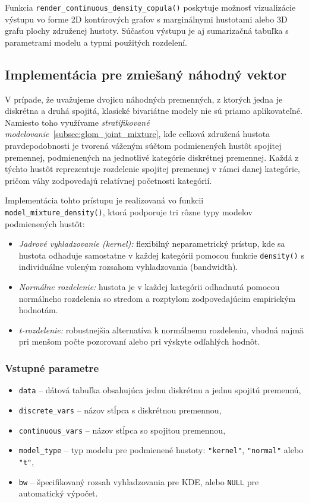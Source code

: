 Funkcia \texttt{render\_continuous\_density\_copula()} poskytuje možnosť vizualizácie výstupu vo forme 2D kontúrových grafov s marginálnymi hustotami alebo 3D grafu plochy združenej hustoty. Súčasťou výstupu je aj sumarizačná tabuľka s parametrami modelu a typmi použitých rozdelení.

\subsection{Implementácia pre zmiešaný náhodný vektor}

V prípade, že uvažujeme dvojicu náhodných premenných, z ktorých jedna je diskrétna a druhá spojitá, klasické bivariátne modely nie sú priamo aplikovateľné. Namiesto toho využívame \emph{stratifikované modelovanie}~\ref{subsec:glom_joint_mixture}, kde celková združená hustota pravdepodobnosti je tvorená váženým súčtom podmienených hustôt spojitej premennej, podmienených na jednotlivé kategórie diskrétnej premennej. Každá z týchto hustôt reprezentuje rozdelenie spojitej premennej v rámci danej kategórie, pričom váhy zodpovedajú relatívnej početnosti kategórií.

Implementácia tohto prístupu je realizovaná vo funkcii \texttt{model\_mixture\_density()}, ktorá podporuje tri rôzne typy modelov podmienených hustôt:

\begin{itemize}
  \item \textit{Jadrové vyhladzovanie (kernel):} flexibilný neparametrický prístup, kde sa hustota odhaduje samostatne v každej kategórii pomocou funkcie \texttt{density()} s individuálne voleným rozsahom vyhladzovania (bandwidth).
  \item \textit{Normálne rozdelenie:} hustota je v každej kategórii odhadnutá pomocou normálneho rozdelenia so stredom a rozptylom zodpovedajúcim empirickým hodnotám.
  \item \textit{t-rozdelenie:} robustnejšia alternatíva k normálnemu rozdeleniu, vhodná najmä pri menšom počte pozorovaní alebo pri výskyte odľahlých hodnôt.
\end{itemize}

\subsubsection{Vstupné parametre}

\begin{itemize}
  \item \texttt{data} – dátová tabuľka obsahujúca jednu diskrétnu a jednu spojitú premennú,
  \item \texttt{discrete\_vars} – názov stĺpca s diskrétnou premennou,
  \item \texttt{continuous\_vars} – názov stĺpca so spojitou premennou,
  \item \texttt{model\_type} – typ modelu pre podmienené hustoty: \texttt{"kernel"}, \texttt{"normal"} alebo \texttt{"t"},
  \item \texttt{bw} – špecifikovaný rozsah vyhladzovania pre KDE, alebo \texttt{NULL} pre automatický výpočet.
\end{itemize}

